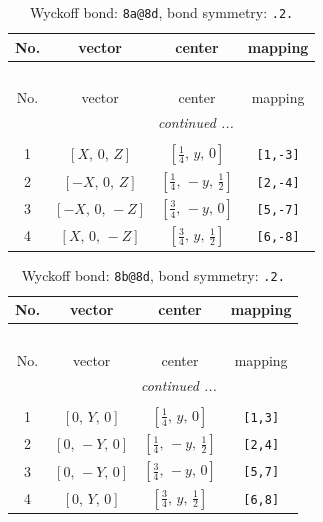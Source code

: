 \documentclass[fleqn,8pt]{jsarticle}
\begin{document}
\begin{longtable}{cccc}
\caption{Wyckoff bond: {\tt 8a@8d}, bond symmetry: {\tt .2.}}
 \\
 \hline \hline
No. & vector & center & mapping \\ \hline \endfirsthead

\multicolumn{3}{l}{\tablename\ \thetable{}} \\
 \hline \hline
No. & vector & center & mapping \\ \hline \endhead

 \hline \hline
\multicolumn{3}{r}{\footnotesize\it continued ...} \\ \endfoot

 \hline \hline
\multicolumn{3}{r}{} \\ \endlastfoot

1 & $\left[ X,\, 0,\, Z \right]$ & $\left[ \frac{1}{4},\, y,\, 0 \right]$ & {\tt [1,-3]} \\ \hline
2 & $\left[ - X,\, 0,\, Z \right]$ & $\left[ \frac{1}{4},\, - y,\, \frac{1}{2} \right]$ & {\tt [2,-4]} \\ \hline
3 & $\left[ - X,\, 0,\, - Z \right]$ & $\left[ \frac{3}{4},\, - y,\, 0 \right]$ & {\tt [5,-7]} \\ \hline
4 & $\left[ X,\, 0,\, - Z \right]$ & $\left[ \frac{3}{4},\, y,\, \frac{1}{2} \right]$ & {\tt [6,-8]} \\
\end{longtable}
\renewcommand{\arraystretch}{1.2}
\begin{longtable}{cccc}
\caption{Wyckoff bond: {\tt 8b@8d}, bond symmetry: {\tt .2.}}
 \\
 \hline \hline
No. & vector & center & mapping \\ \hline \endfirsthead

\multicolumn{3}{l}{\tablename\ \thetable{}} \\
 \hline \hline
No. & vector & center & mapping \\ \hline \endhead

 \hline \hline
\multicolumn{3}{r}{\footnotesize\it continued ...} \\ \endfoot

 \hline \hline
\multicolumn{3}{r}{} \\ \endlastfoot

1 & $\left[ 0,\, Y,\, 0 \right]$ & $\left[ \frac{1}{4},\, y,\, 0 \right]$ & {\tt [1,3]} \\ \hline
2 & $\left[ 0,\, - Y,\, 0 \right]$ & $\left[ \frac{1}{4},\, - y,\, \frac{1}{2} \right]$ & {\tt [2,4]} \\ \hline
3 & $\left[ 0,\, - Y,\, 0 \right]$ & $\left[ \frac{3}{4},\, - y,\, 0 \right]$ & {\tt [5,7]} \\ \hline
4 & $\left[ 0,\, Y,\, 0 \right]$ & $\left[ \frac{3}{4},\, y,\, \frac{1}{2} \right]$ & {\tt [6,8]} \\
\end{longtable}
\end{document}
